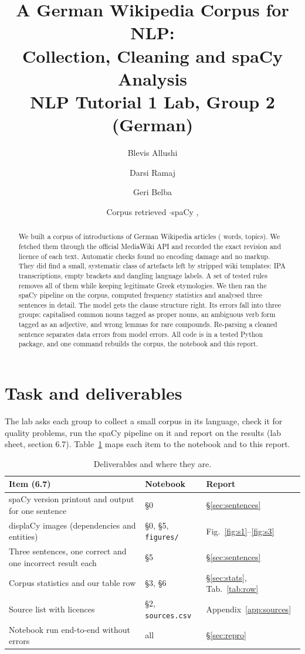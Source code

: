 \documentclass[11pt,a4paper]{article}
\title{A German Wikipedia Corpus for NLP:\\Collection, Cleaning and spaCy Analysis\\[0.4em]
       \large NLP Tutorial 1 Lab, Group 2 (German)}
\author{Blevis Allushi \and Darsi Ramaj \and Geri Belba}
\date{Corpus retrieved \Retrieved{} \quad$\cdot$\quad spaCy \SpacyVersion, \code{\ModelName} \ModelVersion}
\newcommand{\code}[1]{\texttt{#1}}
\begin{document}
\maketitle

\begin{abstract}
\noindent We built a corpus of \NTexts{} introductions of German Wikipedia articles (\NWords{} words, \NTopics{} topics). We fetched them through the official MediaWiki API and recorded the exact revision and licence of each text. Automatic checks found no encoding damage and no markup. They did find a small, systematic class of artefacts left by stripped wiki templates: IPA transcriptions, empty brackets and dangling language labels. A set of tested rules removes all of them while keeping legitimate Greek etymologies. We then ran the spaCy pipeline \code{\ModelName} on the corpus, computed frequency statistics and analysed three sentences in detail. The model gets the clause structure right. Its errors fall into three groups: capitalised common nouns tagged as proper nouns, an ambiguous verb form tagged as an adjective, and wrong lemmas for rare compounds. Re-parsing a cleaned sentence separates data errors from model errors. All code is in a tested Python package, and one command rebuilds the corpus, the notebook and this report.
\end{abstract}

\tableofcontents
\bigskip

\section{Task and deliverables}
The lab asks each group to collect a small corpus in its language, check it for quality problems, run the spaCy pipeline on it and report on the results (lab sheet, section 6.7). Table~\ref{tab:deliverables} maps each item to the notebook and to this report.

\begin{table}[h]\centering\small
\caption{Deliverables and where they are.}\label{tab:deliverables}
\begin{tabular}{p{7.6cm}ll}\toprule
Item (6.7) & Notebook & Report \\\midrule
spaCy version printout and output for one sentence & \S0 & \S\ref{sec:sentences} \\
displaCy images (dependencies and entities) & \S0, \S5, \code{figures/} & Fig.~\ref{fig:s1}--\ref{fig:s3} \\
Three sentences, one correct and one incorrect result each & \S5 & \S\ref{sec:sentences} \\
Corpus statistics and our table row & \S3, \S6 & \S\ref{sec:stats}, Tab.~\ref{tab:row} \\
Source list with licences & \S2, \code{sources.csv} & Appendix~\ref{app:sources} \\
Notebook run end-to-end without errors & all & \S\ref{sec:repro} \\\bottomrule
\end{tabular}
\end{table}
\end{document}
